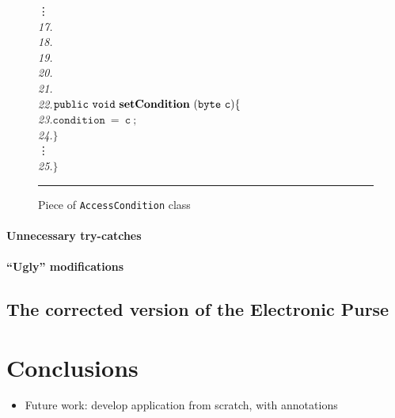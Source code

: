 \documentclass[a4paper]{llncs}
\begin{document}
\begin{center}
\begin{figure}[hbt]
\begin{tabbing}
\>\>\vdots \\

\emph{17.}\> \\
\emph{18.}\>\> \\
\emph{19.}\>\> \\
\emph{20.}\>\> \\
\emph{21.}\>\>{\it */} \\
\emph{22.}\>\>$\mathtt{public\ void\ {\bf setCondition}\ (byte\ c)\{}$\\
\emph{23.}\>\>\>$\mathtt{condition\ =\ c\ ;}$\\
\emph{24.}\>\>$\mathtt{\}}$\\

\>\>\vdots \\
\emph{25.}\>$\mathtt{\}}$
\end{tabbing}
\caption{Piece of {\tt AccessCondition} class}
\label{fig-cla-acc}
\rule{\linewidth}{0.3mm}
\end{figure}
\end{center}




\paragraph{Unnecessary try-catches}




\paragraph{``Ugly'' modifications}




\subsection{The corrected version of the Electronic Purse}






\section{Conclusions}
\label{SectConcl}
\begin{itemize}
\item Future work: develop application from scratch, with annotations
\end{itemize}



\end{document}

